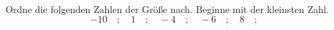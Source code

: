 \begin{aufgabe} ~ \\ 
Ordne die folgenden Zahlen der Größe nach. Beginne mit der kleinsten Zahl.\[-10\quad ; \quad1\quad ; \quad-4\quad ; \quad-6\quad ; \quad8\quad ; \quad\]\underline{\hspace{12cm}}\end{aufgabe} 
